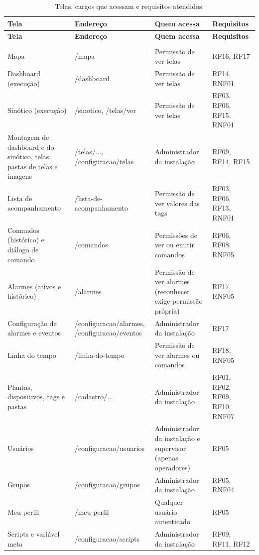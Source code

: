 {\renewcommand{\arraystretch}{1.3}\small
\begin{xltabular}{\textwidth}{>{\raggedright\arraybackslash}p{2.9cm}>{\raggedright\arraybackslash}p{4.3cm}>{\raggedright\arraybackslash}X>{\centering\arraybackslash}p{2.4cm}}
        \caption{Telas, cargos que acessam e requisitos atendidos.}
        \label{tab:cap4_telas}\\
        \hline
        \textbf{Tela} & \textbf{Endereço} & \textbf{Quem acessa} & \textbf{Requisitos} \\
        \hline
        \endfirsthead
        \hline
        \textbf{Tela} & \textbf{Endereço} & \textbf{Quem acessa} & \textbf{Requisitos} \\
        \hline
        \endhead
        \endfoot
         \\
        \endlastfoot
        Mapa & /mapa & Permissão de ver telas & RF16, RF17 \\
        \hline
        Dashboard (execução) & /dashboard & Permissão de ver telas & RF14, RNF01 \\
        \hline
        Sinótico (execução) & /sinotico, /telas/ver & Permissão de ver telas & RF03, RF06, RF15, RNF01 \\
        \hline
        Montagem de dashboard e do sinótico, telas, pastas de telas e imagens & /telas/..., /configuracao/telas & Administrador da instalação & RF09, RF14, RF15 \\
        \hline
        Lista de acompanhamento & /lista-de-acompanhamento & Permissão de ver valores das tags & RF03, RF06, RF13, RNF01 \\
        \hline
        Comandos (histórico) e diálogo de comando & /comandos & Permissões de ver ou emitir comandos & RF06, RF08, RNF05 \\
        \hline
        Alarmes (ativos e histórico) & /alarmes & Permissão de ver alarmes (reconhecer exige permissão própria) & RF17, RNF05 \\
        \hline
        Configuração de alarmes e eventos & /configuracao/alarmes, /configuracao/eventos & Administrador da instalação & RF17 \\
        \hline
        Linha do tempo & /linha-do-tempo & Permissão de ver alarmes ou comandos & RF18, RNF05 \\
        \hline
        Plantas, dispositivos, tags e pastas & /cadastro/... & Administrador da instalação & RF01, RF02, RF09, RF10, RNF07 \\
        \hline
        Usuários & /configuracao/usuarios & Administrador da instalação e supervisor (apenas operadores) & RF05 \\
        \hline
        Grupos & /configuracao/grupos & Administrador da instalação & RF05, RNF04 \\
        \hline
        Meu perfil & /meu-perfil & Qualquer usuário autenticado & RF05 \\
        \hline
        Scripts e variável meta & /configuracao/scripts & Administrador da instalação & RF09, RF11, RF12 \\
        \hline
\end{xltabular}}

